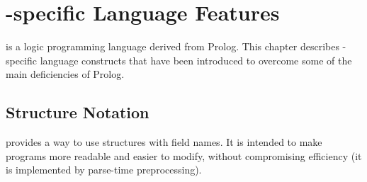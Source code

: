 %
%
%
%
%
%
%
%

\chapter{\eclipse-specific Language Features\label{chaplanguage}}


{\eclipse} is a logic programming language derived from Prolog.
This chapter describes \eclipse-specific language constructs
that have been introduced to overcome some of the main deficiencies
of Prolog.

\section{Structure Notation\label{chapstruct}}

{\eclipse} %
provides a way to use structures with
field names. It is intended to make programs more readable and easier
to modify, without compromising efficiency
(it is implemented by parse-time preprocessing).

